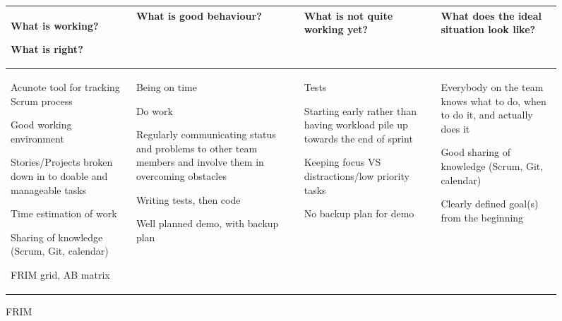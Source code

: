 \documentclass[a4paper,11pt]{article}
\begin{document}
\begin{figure}
	\centering
	\begin{tabular}{|p{3cm}|p{3cm}|p{3cm}|p{3cm}|}
	\hline
	What is working? \par What is right? & What is good behaviour? & What is not quite working yet? & What does the ideal situation look like? \tabularnewline\hline

	Acunote tool for tracking Scrum process
	\par\vspace{.5cm}
	Good working environment
	\par\vspace{.5cm}
	Stories/Projects broken down in to doable and manageable tasks
	\par\vspace{.5cm}
	Time estimation of work
	\par\vspace{.5cm}
	Sharing of knowledge
	(Scrum, Git, calendar)
	\par\vspace{.5cm}
	FRIM grid, AB matrix

	& 

	Being on time
	\par\vspace{.5cm}
	Do work
	\par\vspace{.5cm}
	Regularly communicating status and problems to other team members and involve them in overcoming obstacles
	\par\vspace{.5cm}
	Writing tests, then code
	\par\vspace{.5cm}
	Well planned demo, with backup plan
	
	& 
	
	Tests
	\par\vspace{.5cm}
	Starting early rather than having workload pile up towards the end of sprint
	\par\vspace{.5cm}
	Keeping focus VS distractions/low priority tasks
	\par\vspace{.5cm}
	No backup plan for demo
	
	& 
	
	Everybody on the team knows what to do, when to do it, and actually does it
	\par\vspace{.5cm}
	Good sharing of knowledge
	(Scrum, Git, calendar)
	\par\vspace{.5cm}
	Clearly defined goal(s) from the beginning
	\tabularnewline\hline
	\end{tabular}	
	\caption{FRIM}
\end{figure}
\end{document}
